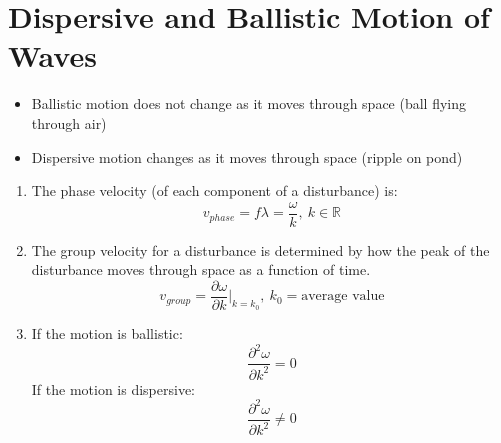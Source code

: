 \documentclass[a4paper, 11pt, normalem]{report}
\newcommand\p{\partial}
\newcommand\lam{\lambda}
\begin{document}
\section{Dispersive and Ballistic Motion of Waves}
\begin{itemize}
    \item Ballistic motion does not change as it moves through space (ball flying through air)
    \item Dispersive motion changes as it moves through space (ripple on pond)
\end{itemize}
\begin{enumerate}
    \item The phase velocity (of each component of a disturbance) is:
    \begin{equation}
        v_{phase} = f\lam = \frac{\omega}{k},~ k \in \mathbb{R}
    \end{equation}
    \item The group velocity for a disturbance is determined by how the peak of the disturbance moves through space as a function of time.
    \begin{equation}
        v_{group} = \frac{\p\omega}{\p k}\Bigg|_{k = k_0}, ~ k_0 = \text{average value}
    \end{equation}
    \item If the motion is ballistic:
    \begin{equation}
        \frac{\p^2\omega}{\p k^2} = 0
    \end{equation}
    If the motion is dispersive:
    \begin{equation}
        \frac{\p^2 \omega}{\p k^2} \neq 0
    \end{equation}
\end{enumerate}
\end{document}
